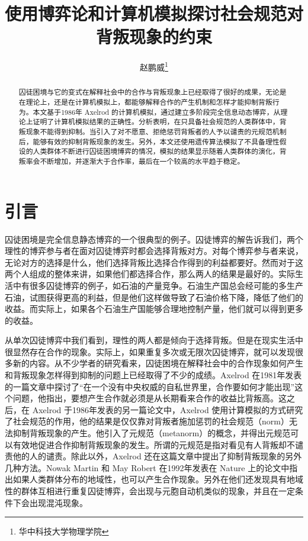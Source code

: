 \documentclass[lang=cn,11pt]{elegantpaper}
\title{使用博弈论和计算机模拟探讨社会规范对背叛现象的约束}
\author{赵鹏威\footnote{华中科技大学物理学院}}
\begin{document}
	
	\maketitle
	
	\begin{abstract}
		\noindent 囚徒困境与它的变式在解释社会中的合作与背叛现象上已经取得了很好的成果，无论是在理论上，还是在计算机模拟上，都能够解释合作的产生机制和怎样才能抑制背叛行为。本文基于1986年 Axelrod 的计算机模拟，通过建立多阶段完全信息动态博弈，从理论上证明了计算机模拟结果的正确性。分析表明，在只具备社会规范的人类群体中，背叛现象不能得到抑制。当引入了对不愿意、拒绝惩罚背叛者的人予以谴责的元规范机制后，能够有效的抑制背叛现象的发生。另外，本文还使用遗传算法模拟了不具备理性假设的人类群体不断进行囚徒困境博弈的情况，模拟的结果显示随着人类群体的演化，背叛率会不断增加，并逐渐大于合作率，最后在一个较高的水平趋于稳定。
	\end{abstract}

\section{引言}\label{sec:引言}
囚徒困境是完全信息静态博弈的一个很典型的例子。囚徒博弈的解告诉我们，两个理性的博弈参与者在面对囚徒博弈时都会选择背叛对方。对每个博弈参与者来说，无论对方的选择是什么，他们选择背叛比选择合作得到的利益都要好。然而对于这两个人组成的整体来讲，如果他们都选择合作，那么两人的结果是最好的。实际生活中有很多囚徒博弈的例子，如石油的产量竞争。石油生产国总会经可能的多生产石油，试图获得更高的利益，但是他们这样做导致了石油价格下降，降低了他们的收益。而实际上，如果各个石油生产国能够合理地控制产量，他们就可以得到更多的收益。

从单次囚徒博弈中我们看到，理性的两人都是倾向于选择背叛。但是在现实生活中很显然存在合作的现象。实际上，如果重复多次或无限次囚徒博弈，就可以发现很多新的内容。从不少学者的研究看来，囚徒困境在解释社会中的合作现象如何产生和背叛现象怎样得到抑制的问题上已经取得了不少的成绩。Axelrod 在1981年发表的一篇文章\cite{axelrod1981evolution}中探讨了“在一个没有中央权威的自私世界里，合作要如何才能出现”这个问题，他指出，要想产生合作就必须是从长期看来合作的收益比背叛高。这之后，在 Axelrod 于1986年发表的另一篇论文\cite{Axelrod1986}中，Axelrod 使用计算模拟的方式研究了社会规范的作用，他的结果是仅仅靠对背叛者施加惩罚的社会规范（norm）无法抑制背叛现象的产生。他引入了元规范（metanorm）的概念，并得出元规范可以有效地促进合作抑制背叛现象的发生。所谓的元规范是指对看见有人背叛却不谴责他的人的谴责。除此以外，Axelrod 还在这篇文章中提出了抑制背叛现象的另外几种方法。Nowak Martin 和 May Robert 在1992年发表在 Nature 上的论文\cite{1992Nature}中指出如果人类群体分布的地域性，也可以产生合作现象。另外在他们还发现具有地域性的群体互相进行重复囚徒博弈，会出现与元胞自动机类似的现象，并且在一定条件下会出现混沌现象。
\end{document}
